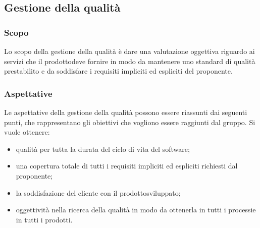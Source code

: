 \subsection{Gestione della qualità}
\subsubsection{Scopo}
Lo scopo della gestione della qualità è dare una valutazione oggettiva riguardo ai servizi che il prodotto\glosp deve fornire in modo da mantenere uno standard di qualità prestabilito e da soddisfare i requisiti impliciti ed espliciti del proponente.
\subsubsection{Aspettative}
Le aspettative della gestione della qualità possono essere riassunti dai seguenti punti, che rappresentano gli obiettivi che vogliono essere raggiunti dal gruppo. Si vuole ottenere:
\begin{itemize}
	\item qualità per tutta la durata del ciclo di vita del software;
	\item una copertura totale di tutti i requisiti impliciti ed espliciti richiesti dal proponente;
	\item la soddisfazione del cliente con il prodotto\glosp sviluppato;
	\item oggettività nella ricerca della qualità in modo da ottenerla in tutti i processi\glosp e in tutti i prodotti\glo.
\end{itemize}
